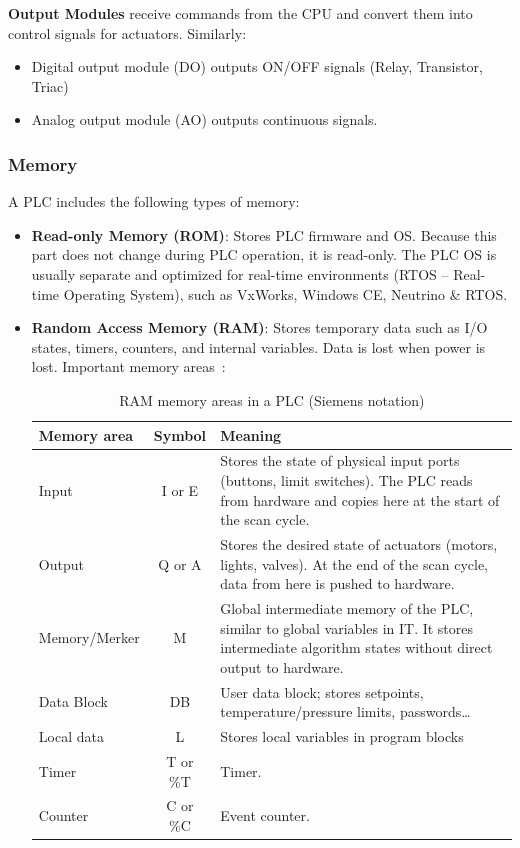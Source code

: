 \documentclass[../main.tex]{subfiles}
\begin{document}
\textbf{Output Modules} receive commands from the CPU and convert them into control signals for actuators. Similarly:

\begin{itemize}
    \item Digital output module (DO) outputs ON/OFF signals (Relay, Transistor, Triac)
    \item Analog output module (AO) outputs continuous signals.
\end{itemize} 


\subsubsection{Memory}

A PLC includes the following types of memory:

\begin{itemize}
    \item \textbf{Read-only Memory (ROM)}: Stores PLC firmware and OS. Because this part does not change during PLC operation, it is read-only. The PLC OS is usually separate and optimized for real-time environments (RTOS -- Real-time Operating System), such as VxWorks, Windows CE, Neutrino \& RTOS.
    \item \textbf{Random Access Memory (RAM)}: Stores temporary data such as I/O states, timers, counters, and internal variables. Data is lost when power is lost. Important memory areas~\cite{snap7_sharp7}:

    \begin{table}[H]
        \centering
        \caption{RAM memory areas in a PLC (Siemens notation)}
        \label{tab:plc-memory}
        \begin{tabular}{|l|c|p{7.5cm}|}
            \hline
            \textbf{Memory area} & \textbf{Symbol} & \textbf{Meaning} \\
            \hline
            Input & I or E & Stores the state of physical input ports (buttons, limit switches). The PLC reads from hardware and copies here at the start of the scan cycle. \\
            \hline
            Output & Q or A & Stores the desired state of actuators (motors, lights, valves). At the end of the scan cycle, data from here is pushed to hardware. \\
            \hline
            Memory/Merker & M & Global intermediate memory of the PLC, similar to global variables in IT. It stores intermediate algorithm states without direct output to hardware. \\
            \hline
            Data Block & DB & User data block; stores setpoints, temperature/pressure limits, passwords\ldots \\
            \hline
            Local data & L & Stores local variables in program blocks \\
            \hline
            Timer & T or \%T & Timer. \\
            \hline
            Counter & C or \%C & Event counter. \\
            \hline
        \end{tabular}
    \end{table}



\end{itemize}
\end{document}

